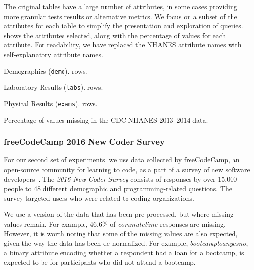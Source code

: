 The original tables have a large number of attributes, in some cases providing more granular tests results or alternative metrics.
We focus on a subset of the attributes for each table to simplify the presentation and exploration of queries.
 shows the attributes selected, along with the percentage of \nullv{} values for each attribute.
For readability, we have replaced the NHANES attribute names with self-explanatory attribute names.

\begin{table}
  \centering
  \begin{subtable}{0.3\textwidth}
    \centering
    
    \caption{Demographics (\texttt{demo}). \demorows{} rows.}
  \end{subtable}\quad\begin{subtable}{0.3\textwidth}
    \centering
    
    \caption{Laboratory Results (\texttt{labs}). \labexrows{} rows.}
  \end{subtable}\quad\begin{subtable}{0.3\textwidth}
    \centering
    
    \caption{Physical Results (\texttt{exams}). \labexrows{} rows.}
  \end{subtable}
  \caption{Percentage of values missing in the CDC NHANES 2013--2014 data.}\label{table:nhanes-description} 
\end{table}

\subsubsection{freeCodeCamp 2016 New Coder Survey}
For our second set of experiments, we use data collected by freeCodeCamp, an open-source
community for learning to code, as a part of a survey of new software
developers~\cite{fcc-data}.  The \textit{2016 New Coder Survey} consists of responses by
over 15,000 people to 48 different demographic and programming-related questions.  The
survey targeted users who were related to coding organizations.

We use a version of the data that has been pre-processed, but where missing values remain.
For example, 46.6\% of \textit{commutetime} responses are missing. However, it is worth
noting that some of the missing values are also expected, given the way the data has been
de-normalized. For example, \textit{bootcamploanyesno}, a binary attribute encoding whether
a respondent had a loan for a bootcamp, is expected to be \nullv{} for participants who did not
attend a bootcamp.

